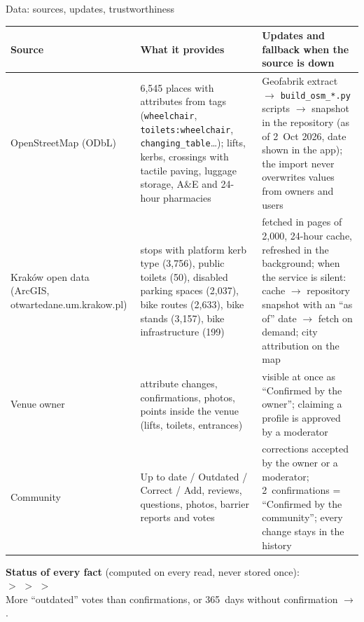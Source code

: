 \begin{frame}{Data: sources, updates, trustworthiness}
  \scriptsize
  \renewcommand{\arraystretch}{1.15}
  \begin{tabularx}{\textwidth}{@{}>{\bfseries\raggedright\arraybackslash}p{2.4cm} X X@{}}
    \toprule
    Source & What it provides & Updates and fallback when the source is down \\
    \midrule
    OpenStreetMap (ODbL) &
      6,545 places with attributes from tags (\texttt{wheelchair}, \texttt{toilets:wheelchair}, \texttt{changing\_table}\ldots);
      lifts, kerbs, crossings with tactile paving, luggage storage, A\&E and 24-hour pharmacies &
      Geofabrik extract $\rightarrow$ \texttt{build\_osm\_*.py} scripts $\rightarrow$ snapshot in the repository
      (as of 2~Oct 2026, date shown in the app); the import never overwrites values from owners and users \\
    Kraków open data (ArcGIS, otwartedane.um.krakow.pl) &
      stops with platform kerb type (3,756), public toilets (50), disabled parking spaces (2,037),
      bike routes (2,633), bike stands (3,157), bike infrastructure (199) &
      fetched in pages of 2,000, 24-hour cache, refreshed in the background; when the service is silent:
      cache $\rightarrow$ repository snapshot with an “as of” date $\rightarrow$ fetch on demand; city attribution on the map \\
    Venue owner &
      attribute changes, confirmations, photos, points inside the venue (lifts, toilets, entrances) &
      visible at once as “Confirmed by the owner”; claiming a profile is approved by a moderator \\
    Community &
      Up to date / Outdated / Correct / Add, reviews, questions, photos, barrier reports and votes &
      corrections accepted by the owner or a moderator; 2~confirmations = “Confirmed by the community”;
      every change stays in the history \\
    \bottomrule
  \end{tabularx}

  \vspace{1.2mm}
  \textbf{Status of every fact} (computed on every read, never stored once):\\[0.6mm]
   $>$
   $>$
   $>$
  \\[0.6mm]
  More “outdated” votes than confirmations, or 365~days without confirmation $\rightarrow$
  .


\end{frame}
